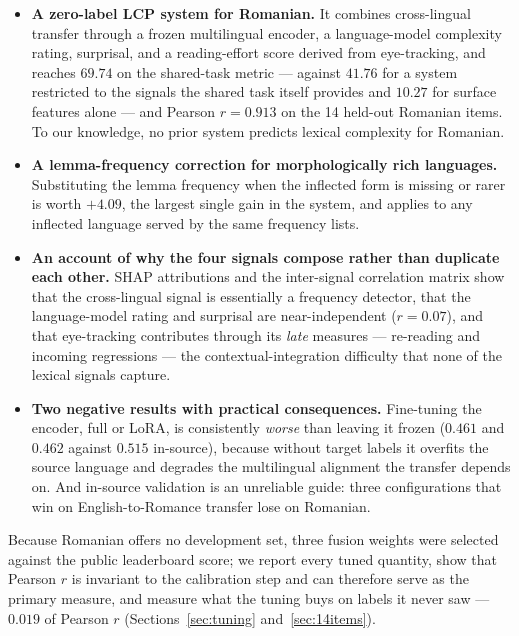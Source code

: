 \documentclass[11pt]{article}
\begin{document}
\begin{itemize}
\item \textbf{A zero-label LCP system for Romanian.} It combines
  cross-lingual transfer through a frozen multilingual encoder, a
  language-model complexity rating, surprisal, and a reading-effort score
  derived from eye-tracking, and reaches $69.74$ on the shared-task
  metric --- against $41.76$ for a system restricted to the signals the
  shared task itself provides and $10.27$ for surface features alone ---
  and Pearson $r = 0.913$ on the 14 held-out Romanian items. To our
  knowledge, no prior system predicts lexical complexity for Romanian.

\item \textbf{A lemma-frequency correction for morphologically rich
  languages.} Substituting the lemma frequency when the inflected form is
  missing or rarer is worth $+4.09$, the largest single gain in the
  system, and applies to any inflected language served by the same
  frequency lists.

\item \textbf{An account of why the four signals compose rather than
  duplicate each other.} SHAP attributions and the inter-signal
  correlation matrix show that the cross-lingual signal is essentially a
  frequency detector, that the language-model rating and surprisal are
  near-independent ($r = 0.07$), and that eye-tracking contributes
  through its \emph{late} measures --- re-reading and incoming
  regressions --- the contextual-integration difficulty that none of the
  lexical signals capture.

\item \textbf{Two negative results with practical consequences.}
  Fine-tuning the encoder, full or LoRA, is consistently \emph{worse}
  than leaving it frozen ($0.461$ and $0.462$ against $0.515$ in-source),
  because without target labels it overfits the source language and
  degrades the multilingual alignment the transfer depends on. And
  in-source validation is an unreliable guide: three configurations that
  win on English-to-Romance transfer lose on Romanian.
\end{itemize}

Because Romanian offers no development set, three fusion weights were
selected against the public leaderboard score; we report every tuned
quantity, show that Pearson $r$ is invariant to the calibration step and
can therefore serve as the primary measure, and measure what the tuning
buys on labels it never saw --- $0.019$ of Pearson $r$
(Sections~\ref{sec:tuning} and~\ref{sec:14items}).
\end{document}
